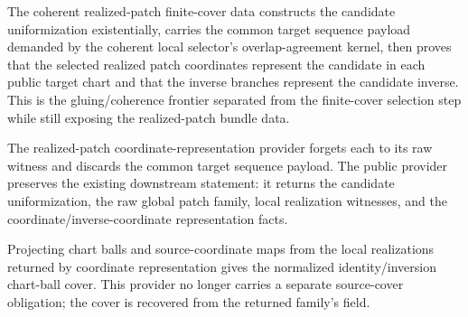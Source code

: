 \begin{lemma}
\label{lem:montel-finite-cover-coordinate-representation-with-realized-patches}
The coherent realized-patch finite-cover data constructs the candidate
uniformization existentially, carries the common target sequence payload
demanded by the coherent local selector's overlap-agreement kernel, then proves
that the selected realized patch coordinates represent the candidate in each
public target chart and that the inverse branches represent the candidate
inverse. This is the gluing/coherence frontier separated from the finite-cover
selection step while still exposing the realized-patch bundle data.
\end{lemma}

\begin{lemma}
\label{lem:montel-finite-cover-coordinate-representation}
The realized-patch coordinate-representation provider forgets each
 to its raw
 witness and discards the common
target sequence payload. The public provider preserves the existing downstream
statement: it returns the candidate uniformization, the raw global patch family,
local realization witnesses, and the coordinate/inverse-coordinate
representation facts.
\end{lemma}

\begin{lemma}
\label{lem:montel-normalized-limit-two-chart-cover-without-source-cover}
Projecting chart balls and source-coordinate maps from the local realizations
returned by coordinate representation gives the normalized identity/inversion
chart-ball cover. This provider no longer carries a separate source-cover
obligation; the cover is recovered from the returned family's
 field.
\end{lemma}

